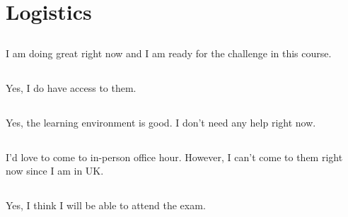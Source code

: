 \documentclass[12pt]{article}
\begin{document}
\pagebreak


\section{Logistics}
\subsection{}
I am doing great right now and  I am ready for the challenge in this course.

\subsection{}
Yes, I do have access to them.

\subsection{}
Yes, the learning environment is good. I don't need any help right now.

\subsection{}
I'd love to come to in-person office hour. However, I can't come to them right now since I am in UK.

\subsection{}
Yes, I think I will be able to attend the exam.
\end{document}
